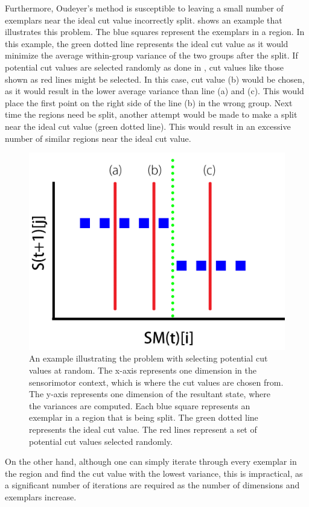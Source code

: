 Furthermore, Oudeyer's method is susceptible to leaving a small number of exemplars near the ideal cut value incorrectly split.  shows an example that illustrates this problem. The blue squares represent the exemplars in a region. In this example, the green dotted line represents the ideal cut value as it would minimize the average within-group variance of the two groups after the split. If potential cut values are selected randomly as done in \cite{Oudeyer2005}, cut values like those shown as red lines might be selected. In this case, cut value (b) would be chosen, as it would result in the lower average variance than line (a) and (c). This would place the first point on the right side of the line (b) in the wrong group. Next time the regions need be split, another attempt would be made to make a split near the ideal cut value (green dotted line). This would result in an excessive number of similar regions near the ideal cut value. 

\begin{figure}[htb]
	\centering
	\includegraphics[width=0.7 \textwidth]{"fig/cbla/bad-cut-example"}
	\caption[An example of making undesirable cuts using randomly selection method]{An example illustrating the problem with selecting potential cut values at random. The x-axis represents one dimension in the sensorimotor context, which is where the cut values are chosen from. The y-axis represents one dimension of the resultant state, where the variances are computed. Each blue square represents an exemplar in a region that is being split. The green dotted line represents the ideal cut value. The red lines represent a set of potential cut values selected randomly.}
	\label{fig:bad-cut-example}
\end{figure}

On the other hand, although one can simply iterate through every exemplar in the region and find the cut value with the lowest variance, this is impractical, as a significant number of iterations are required as the number of dimensions and exemplars increase. 

